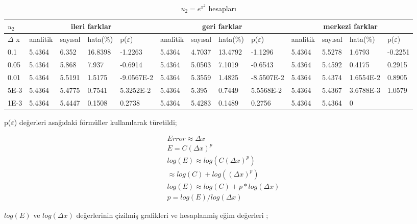 \documentclass[paper=a4, fontsize=11pt]{scrartcl} %
\numberwithin{equation}{section} %
\numberwithin{figure}{section} %
\numberwithin{table}{section} %
\begin{document}
\begin{table}[ht]
\centering
\begin{adjustbox}{width=1\textwidth}
\small
\begin{tabular}{ | l | l | l | l | l | l | l | l | l | l | l | l | l |}
\hline
	$u_2$ & \multicolumn{4}{c|}{ileri farklar}  & \multicolumn{4}{c|}{geri farklar} &  \multicolumn{4}{c|}{merkezi farklar}   \\ \hline
	$\Delta$ x & analitik & say{\i}sal & hata(\%) & p($\varepsilon$) & analitik & say{\i}sal & hata(\%) & p($\varepsilon$) & analitik & say{\i}sal & hata(\%) & p($\varepsilon$) \\ \hline
	0.1 & 5.4364 & 6.352 & 16.8398 & -1.2263 & 5.4364 & 4.7037 & 13.4792 & -1.1296 & 5.4364 & 5.5278 & 1.6793 & -0.2251 \\ \hline
	0.05 & 5.4364 & 5.868 & 7.937 & -0.6914 & 5.4364 & 5.0503 & 7.1019 & -0.6543 & 5.4364 & 5.4592 & 0.4175 & 0.2915 \\ \hline
	0.01 & 5.4364 & 5.5191 & 1.5175 & -9.0567E-2 & 5.4364 & 5.3559 & 1.4825 & -8.5507E-2 & 5.4364 & 5.4374 & 1.6554E-2 & 0.8905 \\ \hline
	5E-3 & 5.4364 & 5.4775 & 0.7541 & 5.3252E-2 & 5.4364 & 5.395 & 0.7449 & 5.5568E-2 & 5.4364 & 5.4367 & 3.6788E-3 & 1.0579 \\ \hline
	1E-3 & 5.4364 & 5.4447 & 0.1508 & 0.2738 & 5.4364 & 5.4283 & 0.1489 & 0.2756 & 5.4364 & 5.4364 & 0 &  \\ \hline
\end{tabular}
\end{adjustbox}
\caption{$u_2 = e ^{ {x^ 2}} $ hesaplar{\i}} 
\end{table} 

p($\varepsilon$) de\u{g}erleri asa\u{g}{\i}daki f\"orm\"uller kullan{\i}larak t\"uretildi;

\begin{align}
Error \approx \Delta x \\
E=C(\Delta x)^p \\
log(E) \approx log(C(\Delta x)^p) \\
\approx log(C)+log((\Delta x)^p) \\
log(E) \approx log(C)+p*log(\Delta x) \\
p = log(E)/log(\Delta x)
\end{align}

$ log(E)$ ve $log(\Delta x) $ de\u{g}erlerinin \c{c}izilmi\c{s} grafikleri ve hesaplanmi\c{s} e\u{g}im de\u{g}erleri ;
\end{document}
